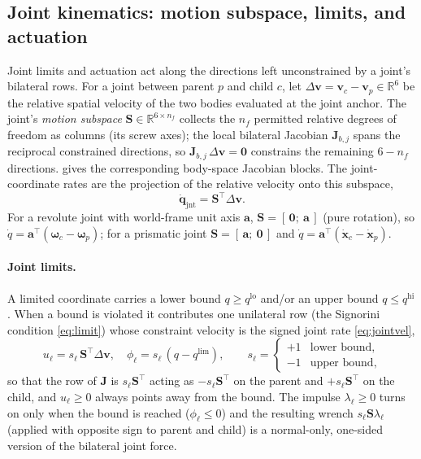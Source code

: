 \documentclass{article}
\newcommand{\Jac}{\mathbf{J}}
\newcommand{\vv}{\mathbf{v}}
\newcommand{\Rbb}{\mathbb{R}}
\theoremstyle{plain}
\theoremstyle{definition}
\begin{document}
\subsection{Joint kinematics: motion subspace, limits, and actuation}
\label{sec:jointspace}
Joint limits and actuation act along the directions left unconstrained by a
joint's bilateral rows. For a joint between parent $p$ and child $c$,
let $\Delta\vv=\vv_c-\vv_p\in\Rbb^{6}$ be the relative spatial velocity of the two
bodies evaluated at the joint anchor. The joint's \emph{motion subspace}
$\mathbf S\in\Rbb^{6\times n_f}$ collects the $n_f$ permitted relative degrees of
freedom as columns (its screw axes); the local bilateral Jacobian
$\Jac_{b,j}$ spans the reciprocal constrained directions, so
$\Jac_{b,j}\,\Delta\vv=\mathbf 0$ constrains the remaining $6-n_f$ directions.
 gives the corresponding body-space Jacobian blocks. The
joint-coordinate rates are the projection of the relative velocity onto this
subspace,
\begin{equation}
\dot{\mathbf q}_{\mathrm{jnt}} = \mathbf S^{\top}\Delta\vv .
\label{eq:jointvel}
\end{equation}
For a revolute joint with world-frame unit axis $\mathbf a$, $\mathbf S=[\,\mathbf
0;\ \mathbf a\,]$ (pure rotation), so $\dot q=\mathbf a^{\top}(\boldsymbol\omega_c-
\boldsymbol\omega_p)$; for a prismatic joint $\mathbf S=[\,\mathbf a;\ \mathbf
0\,]$ and $\dot q=\mathbf a^{\top}(\dot{\mathbf x}_c-\dot{\mathbf x}_p)$.

\paragraph{Joint limits.} A limited coordinate carries a lower bound
$q\ge q^{\mathrm{lo}}$ and/or an upper bound $q\le q^{\mathrm{hi}}$. When a bound is
violated it contributes one unilateral row (the Signorini condition
\eqref{eq:limit}) whose constraint velocity is the signed joint rate
\eqref{eq:jointvel},
\begin{equation}
u_\ell = s_\ell\,\mathbf S^{\top}\Delta\vv,\quad
\phi_\ell = s_\ell\,(q-q^{\mathrm{lim}}),\qquad
s_\ell=\!\begin{cases}+1 & \text{lower bound},\\ -1 & \text{upper bound},\end{cases}
\label{eq:limitrow}
\end{equation}
so that the row of $\Jac$ is $s_\ell\mathbf S^{\top}$ acting as $-s_\ell\mathbf S^{\top}$
on the parent and $+s_\ell\mathbf S^{\top}$ on the child, and $u_\ell\ge0$ always
points away from the bound. The impulse $\lambda_\ell\ge0$ turns on only when the
bound is reached ($\phi_\ell\le0$) and the resulting wrench $s_\ell\mathbf S\lambda_\ell$
(applied with opposite sign to parent and child) is a normal-only, one-sided
version of the bilateral joint force.
\end{document}
